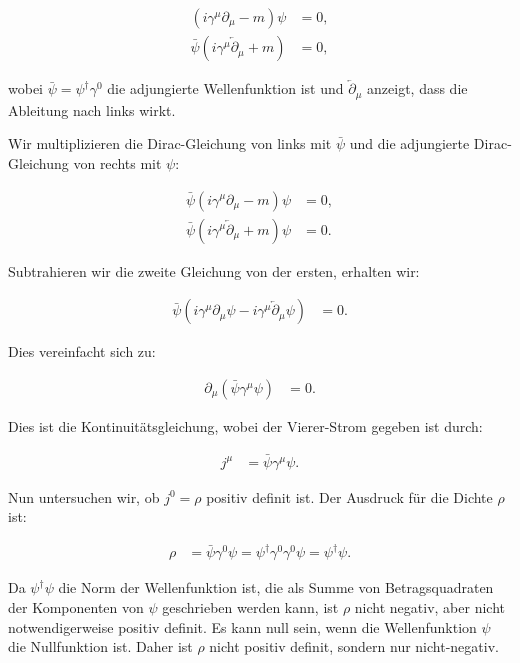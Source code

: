 \documentclass[11pt,a4paper]{article}
\begin{document}
\begin{align*}
(i \gamma^\mu \partial_\mu - m) \psi &= 0, \\
\bar{\psi} (i \gamma^\mu \overleftarrow{\partial}_\mu + m) &= 0,
\end{align*}

wobei \(\bar{\psi} = \psi^\dagger \gamma^0\) die adjungierte Wellenfunktion ist und \(\overleftarrow{\partial}_\mu\) anzeigt, dass die Ableitung nach links wirkt.

Wir multiplizieren die Dirac-Gleichung von links mit \(\bar{\psi}\) und die adjungierte Dirac-Gleichung von rechts mit \(\psi\):

\begin{align*}
\bar{\psi} (i \gamma^\mu \partial_\mu - m) \psi &= 0, \\
\bar{\psi} (i \gamma^\mu \overleftarrow{\partial}_\mu + m) \psi &= 0.
\end{align*}

Subtrahieren wir die zweite Gleichung von der ersten, erhalten wir:

\begin{align*}
\bar{\psi} (i \gamma^\mu \partial_\mu \psi - i \gamma^\mu \overleftarrow{\partial}_\mu \psi) &= 0.
\end{align*}

Dies vereinfacht sich zu:

\begin{align*}
\partial_\mu (\bar{\psi} \gamma^\mu \psi) &= 0.
\end{align*}

Dies ist die Kontinuitätsgleichung, wobei der Vierer-Strom gegeben ist durch:

\begin{align*}
j^\mu &= \bar{\psi} \gamma^\mu \psi.
\end{align*}

Nun untersuchen wir, ob \(j^0 = \rho\) positiv definit ist. Der Ausdruck für die Dichte \(\rho\) ist:

\begin{align*}
\rho &= \bar{\psi} \gamma^0 \psi = \psi^\dagger \gamma^0 \gamma^0 \psi = \psi^\dagger \psi.
\end{align*}

Da \(\psi^\dagger \psi\) die Norm der Wellenfunktion ist, die als Summe von Betragsquadraten der Komponenten von \(\psi\) geschrieben werden kann, ist \(\rho\) nicht negativ, aber nicht notwendigerweise positiv definit. Es kann null sein, wenn die Wellenfunktion \(\psi\) die Nullfunktion ist. Daher ist \(\rho\) nicht positiv definit, sondern nur nicht-negativ.
\end{document}
